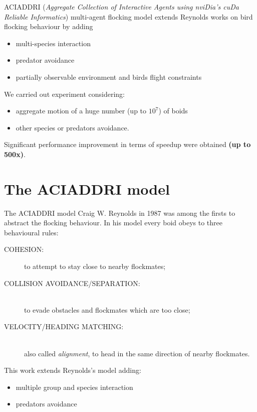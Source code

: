 \documentclass{beamer}
\begin{document}
\begin{frame}

ACIADDRI (\textit{Aggregate
Collection of Interactive Agents using nviDia's cuDa Reliable
Informatics}) multi-agent flocking model extends Reynolds works on bird flocking behaviour by adding 
\begin{itemize}
\item multi-species interaction
\item  predator avoidance
\item partially observable environment and birds flight constraints
\end{itemize}
We carried out experiment considering:
\begin{itemize}
\item aggregate motion of a huge number
(up to $10^7$) of boids
\item other species or predators avoidance. 
\end{itemize}
Significant performance
improvement in terms of speedup were obtained \textbf{(up to 500x)}.
\end{frame}

\section{The ACIADDRI model}
\begin{frame}{The ACIADDRI model}
Craig W. Reynolds in 1987  was among
the firsts to abstract the flocking behaviour. In his model every boid obeys to three behavioural rules:
\begin{description}
\item[COHESION: ] to attempt to stay close to nearby flockmates;
\item[COLLISION AVOIDANCE/SEPARATION: ] \hfill \\ 
to evade obstacles and flockmates which are too
close;
\item[VELOCITY/HEADING MATCHING:]\hfill \\
also called \textit{alignment}, to head in the same direction
of nearby flockmates.
\end{description}
This work extends Reynolds's model adding:
\begin{itemize}
	\item multiple group and species interaction
	\item predators avoidance
\end{itemize}
\end{frame}
\end{document}
